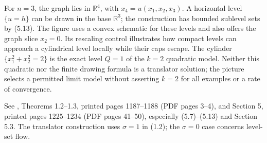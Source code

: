 \begin{example}
For $n=3$, the graph lies in $\mathbb R^4$, with $x_4=u(x_1,x_2,x_3)$. A horizontal level $\{u=h\}$ can be drawn in the base $\mathbb R^3$; the construction has bounded sublevel sets by (5.13). The figure uses a convex schematic for these levels and also offers the graph slice $x_2=0$. Its rescaling control illustrates how compact levels can approach a cylindrical level locally while their caps escape. The cylinder $\{x_1^2+x_2^2=2\}$ is the exact level $Q=1$ of the $k=2$ quadratic model. Neither this quadratic nor the finite drawing formula is a translator solution; the picture selects a permitted limit model without asserting $k=2$ for all examples or a rate of convergence.

See \cite{CatXJWang11}, Theorems 1.2--1.3, printed pages 1187--1188 (PDF pages 3--4), and Section 5, printed pages 1225--1234 (PDF pages 41--50), especially (5.7)--(5.13) and Section 5.3. The translator construction uses $\sigma=1$ in (1.2); the $\sigma=0$ case concerns level-set flow.
\end{example}



